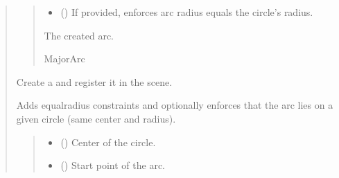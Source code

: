 \documentclass[letterpaper,10pt,english]{sphinxmanual}
\begin{document}
\begin{quote}
\begin{fulllineitems}
\begin{fulllineitems}
\begin{quote}
\begin{description}
\begin{itemize}
\item {} 
\sphinxAtStartPar
{} (\sphinxstyleliteralemphasis{\sphinxupquote{ | }}) \textendash{} If provided, enforces arc radius equals the circle’s radius.

\end{itemize}

\sphinxAtStartPar
The created arc.

\sphinxAtStartPar
MajorArc

\end{description}\end{quote}

\end{fulllineitems}


\begin{fulllineitems}
\label{\detokenize{pygeox:pygeox.add_objects.AddNamespace.minor_arc}}
\pysigstartsignatures
\pysiglinewithargsret
{}
{\sphinxparamcomma {}\sphinxparamcomma {}\sphinxparamcomma {}\sphinxparamcomma {}}
{}
\pysigstopsignatures
\sphinxAtStartPar
Create a  and register it in the scene.

\sphinxAtStartPar
Adds equal\sphinxhyphen{}radius constraints and optionally enforces that the arc
lies on a given circle (same center and radius).
\begin{quote}\begin{description}
\begin{itemize}
\item {} 
\sphinxAtStartPar
{} () \textendash{} Center of the circle.

\item {} 
\sphinxAtStartPar
{} () \textendash{} Start point of the arc.


\end{itemize}
\end{description}
\end{quote}
\end{fulllineitems}
\end{fulllineitems}
\end{quote}
\end{document}
